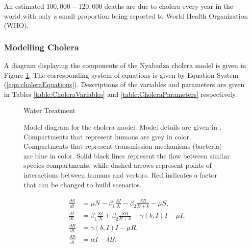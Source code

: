 \documentclass[letter,12pt, usenames,dvipsnames]{article}
\begin{document}
An estimated $100,000 - 120,000$ deaths are due to cholera every year in the world with only a small proportion being reported to World Health Organization (WHO).


\subsubsection{Modelling Cholera}
A diagram displaying the components of the Nyabadza cholera model is given in Figure \ref{fig:CholeraDiagram}.  The corresponding system of equations is given by Equation System (\ref{eqn:choleraEquations}).  Descriptions of the variables and parameters are given in Tables \ref{table:CholeraVariables} and \ref{table:CholeraParameters} respectively.

\begin{figure}[h!]
\centering
{}

{\color{BrickRed}Water Treatment}

\caption{Model diagram for the cholera model.  Model details are given in \cite{cholera}. Compartments that represent humans are grey in color.  Compartments that represent transmission mechanisms (bacteria) are blue in color.  Solid black lines represent the flow between similar species compartments, while dashed arrows represent points of interactions between humans and vectors. Red indicates a factor that can be changed to build scenarios.}
\label{fig:CholeraDiagram}
\end{figure}


\begin{align}
\label{eqn:choleraEquations}
\begin{split}
\frac{dS}{dt} &= \mu N - \beta_1 \frac{SI}{N}-\beta_2\frac{SB}{B+k} - \mu S,\\
\frac{dI}{dt} &= \beta_1\frac{SI}{N} +\beta_2\frac{SB}{B+k} - \gamma (b,I)I - \mu I,\\
\frac{dR}{dt} &= \gamma (b,I)I - \mu R,\\
\frac{dB}{dt} &= \alpha I - \delta B.\\
\end{split}
\end{align}
\end{document}
